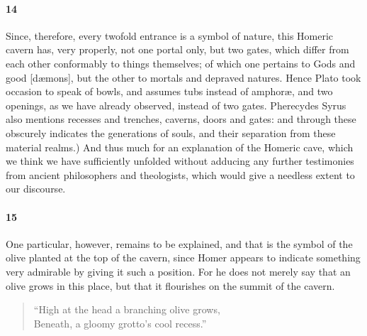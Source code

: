 \documentclass[12pt]{article}
\begin{document}
\paragraph{14} Since, therefore, every twofold entrance is a symbol of nature,
this Homeric cavern has, very properly, not one portal only, but two gates,
which differ from each other conformably to things themselves; of which one
pertains to Gods and good [d{\ae}mons], but the other to mortals and depraved
natures. Hence Plato took occasion to speak of bowls, and assumes tubs instead
of amphor{\ae}, and two openings, as we have already observed, instead of two
gates. Pherecydes Syrus also mentions recesses and trenches, caverns, doors and
gates: and through these obscurely indicates the generations of souls, and
their separation from these material realms.) And thus much for an explanation
of the Homeric cave, which we think we have sufficiently unfolded without
adducing any further testimonies from ancient philosophers and theologists,
which would give a needless extent to our discourse.


\paragraph{15} One particular, however, remains to be explained, and that is
the symbol of the olive planted at the top of the cavern, since Homer appears
to indicate something very admirable by giving it such a position. For he does
not merely say that an olive grows in this place, but that it flourishes on the
summit of the cavern.

\begin{verse}
``High at the head a branching olive grows,\\
Beneath, a gloomy grotto's cool recess.''
\end{verse}
\end{document}
